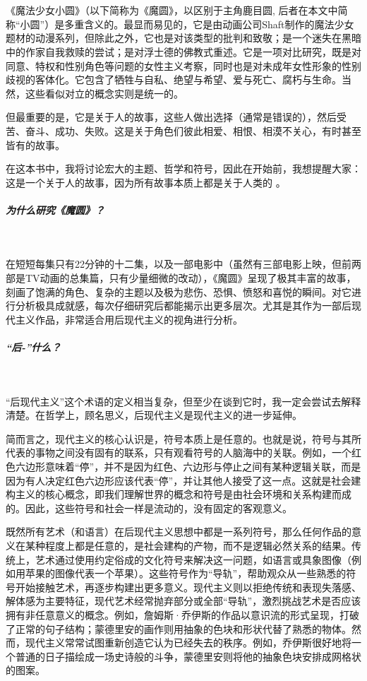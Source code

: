 \chapter{}
《魔法少女小圆》（以下简称为《魔圆》，以区别于主角鹿目圆\cite{ref1}, 后者在本文中简称“小圆”）是多重含义的。最显而易见的，它是由动画公司Shaft制作的魔法少女题材的动漫系列，但除此之外，它也是对该类型的批判和致敬；是一个迷失在黑暗中的作家自我救赎的尝试；是对浮士德的佛教式重述。它是一项对比研究，既是对同意、特权和性别角色等问题的女性主义考察，同时也是对未成年女性形象的性别歧视的客体化。它包含了牺牲与自私、绝望与希望、爱与死亡、腐朽与生命。当然，这些看似对立的概念实则是统一的。

但最重要的是，它是关于人的故事，这些人做出选择（通常是错误的），然后受苦、奋斗、成功、失败。这是关于角色们彼此相爱、相恨、相漠不关心，有时甚至皆有的故事。

在这本书中，我将讨论宏大的主题、哲学和符号，因此在开始前，我想提醒大家：这是一个关于人的故事，因为所有故事本质上都是关于人类的\cite{ref2} 。 
\paragraph{为什么研究《魔圆》？}~{}

在短短每集只有22分钟的十二集，以及一部电影中（虽然有三部电影上映，但前两部是TV动画的总集篇，只有少量细微的改动），《魔圆》呈现了极其丰富的故事，刻画了饱满的角色、复杂的主题以及极为悲伤、恐惧、愤怒和喜悦的瞬间。对它进行分析极具成就感，每次仔细研究后都能揭示出更多层次。尤其是其作为一部后现代主义作品，非常适合用后现代主义的视角进行分析。
\paragraph{“后-”什么？}~{}

“后现代主义”这个术语的定义相当复杂，但至少在谈到它时，我一定会尝试去解释清楚。在哲学上，顾名思义，后现代主义是现代主义的进一步延伸。

简而言之，现代主义的核心认识是，符号本质上是任意的。也就是说，符号与其所代表的事物之间没有固有的联系，只有观看符号的人脑海中的关联。例如，一个红色六边形意味着“停”，并不是因为红色、六边形与停止之间有某种逻辑关联，而是因为有人决定红色六边形应该代表“停”，并让其他人接受了这一点。这就是社会建构主义的核心概念，即我们理解世界的概念和符号是由社会环境和关系构建而成的。因此，这些符号和社会一样是流动的，没有固定的客观意义\cite{ref3}。

既然所有艺术（和语言）在后现代主义思想中都是一系列符号，那么任何作品的意义在某种程度上都是任意的，是社会建构的产物，而不是逻辑必然关系的结果。传统上，艺术通过使用约定俗成的文化符号来解决这一问题，如语言或具象图像（例如用苹果的图像代表一个苹果）。这些符号作为“导轨”，帮助观众从一些熟悉的符号开始接触艺术，再逐步构建出更多意义。现代主义则以拒绝传统和表现失落感、解体感为主要特征，现代艺术经常抛弃部分或全部“导轨”，激烈挑战艺术是否应该拥有非任意意义的概念。例如，詹姆斯·乔伊斯的作品以意识流的形式呈现，打破了正常的句子结构；蒙德里安的画作则用抽象的色块和形状代替了熟悉的物体。然而，现代主义常常试图重新创造它认为已经失去的秩序\cite{ref4}。例如，乔伊斯很好地将一个普通的日子描绘成一场史诗般的斗争，蒙德里安则将他的抽象色块安排成网格状的图案。

